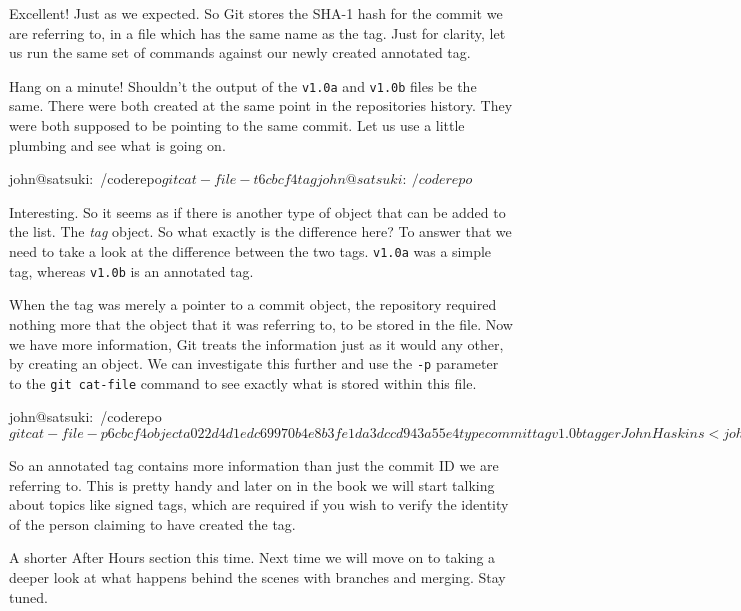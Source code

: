 Excellent! Just as we expected.
So Git stores the SHA-1 hash for the commit we are referring to, in a file which has the same name as the tag.
Just for clarity, let us run the same set of commands against our newly created annotated tag.


Hang on a minute! Shouldn't the output of the \texttt{v1.0a} and \texttt{v1.0b} files be the same.
There were both created at the same point in the repositories history.
They were both supposed to be pointing to the same commit.
Let us use a little plumbing and see what is going on.

\begin{code}
john@satsuki:~/coderepo$ git cat-file -t 6cbcf4
tag
john@satsuki:~/coderepo$
\end{code}

Interesting.
So it seems as if there is another type of object that can be added to the list.
The \emph{tag} object.
So what exactly is the difference here? To answer that we need to take a look at the difference between the two tags.
\texttt{v1.0a} was a simple tag, whereas \texttt{v1.0b} is an annotated tag.

When the tag was merely a pointer to a commit object, the repository required nothing more that the object that it was referring to, to be stored in the file.
Now we have more information, Git treats the information just as it would any other, by creating an object.
We can investigate this further and use the \texttt{-p} parameter to the \texttt{git cat-file} command to see exactly what is stored within this file.

\begin{code}
john@satsuki:~/coderepo$ git cat-file -p 6cbcf4
object a022d4d1edc69970b4e8b3fe1da3dccd943a55e4
type commit
tag v1.0b
tagger John Haskins <john.haskins@tamagoyakiinc.koala>
 Thu Mar 31 23:55:50 2011 +0100

This is an annotated tag
john@satsuki:~/coderepo$
\end{code}

So an annotated tag contains more information than just the commit ID we are referring to.
This is pretty handy and later on in the book we will start talking about topics like signed tags, which are required if you wish to verify the identity of the person claiming to have created the tag.

A shorter After Hours section this time.
Next time we will move on to taking a deeper look at what happens behind the scenes with branches and merging.
Stay tuned.
